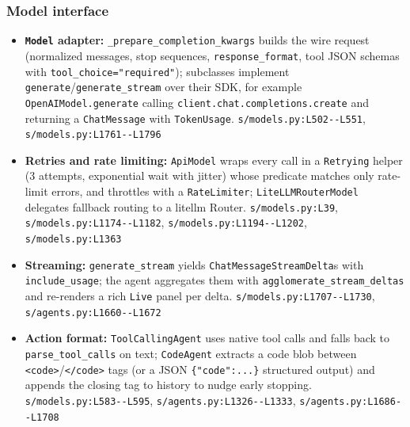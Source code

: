 \subsubsection*{Model interface}
\begin{itemize}
\item \textbf{\texttt{Model} adapter:} \texttt{\_\allowbreak{}prepare\_\allowbreak{}completion\_\allowbreak{}kwargs} builds the wire request (normalized messages, stop sequences, \texttt{response\_\allowbreak{}format}, tool JSON schemas with \texttt{tool\_\allowbreak{}choice="required"}); subclasses implement \texttt{generate}/\texttt{generate\_\allowbreak{}stream} over their SDK, for example \texttt{OpenAIModel.\allowbreak{}generate} calling \texttt{client.\allowbreak{}chat.\allowbreak{}completions.\allowbreak{}create} and returning a \texttt{ChatMessage} with \texttt{TokenUsage}. \texttt{s/\allowbreak{}models.\allowbreak{}py:\allowbreak{}L502-\allowbreak{}-\allowbreak{}L551}, \texttt{s/\allowbreak{}models.\allowbreak{}py:\allowbreak{}L1761-\allowbreak{}-\allowbreak{}L1796}
\item \textbf{Retries and rate limiting:} \texttt{ApiModel} wraps every call in a \texttt{Retrying} helper (3 attempts, exponential wait with jitter) whose predicate matches only rate-limit errors, and throttles with a \texttt{RateLimiter}; \texttt{LiteLLMRouterModel} delegates fallback routing to a litellm Router. \texttt{s/\allowbreak{}models.\allowbreak{}py:\allowbreak{}L39}, \texttt{s/\allowbreak{}models.\allowbreak{}py:\allowbreak{}L1174-\allowbreak{}-\allowbreak{}L1182}, \texttt{s/\allowbreak{}models.\allowbreak{}py:\allowbreak{}L1194-\allowbreak{}-\allowbreak{}L1202}, \texttt{s/\allowbreak{}models.\allowbreak{}py:\allowbreak{}L1363}
\item \textbf{Streaming:} \texttt{generate\_\allowbreak{}stream} yields \texttt{ChatMessageStreamDelta}s with \texttt{include\_\allowbreak{}usage}; the agent aggregates them with \texttt{agglomerate\_\allowbreak{}stream\_\allowbreak{}deltas} and re-renders a rich \texttt{Live} panel per delta. \texttt{s/\allowbreak{}models.\allowbreak{}py:\allowbreak{}L1707-\allowbreak{}-\allowbreak{}L1730}, \texttt{s/\allowbreak{}agents.\allowbreak{}py:\allowbreak{}L1660-\allowbreak{}-\allowbreak{}L1672}
\item \textbf{Action format:} \texttt{ToolCallingAgent} uses native tool calls and falls back to \texttt{parse\_\allowbreak{}tool\_\allowbreak{}calls} on text; \texttt{CodeAgent} extracts a code blob between \texttt{<code>}/\texttt{</\allowbreak{}code>} tags (or a JSON \texttt{\{"code":\allowbreak{}.\allowbreak{}.\allowbreak{}.\allowbreak{}\}} structured output) and appends the closing tag to history to nudge early stopping. \texttt{s/\allowbreak{}models.\allowbreak{}py:\allowbreak{}L583-\allowbreak{}-\allowbreak{}L595}, \texttt{s/\allowbreak{}agents.\allowbreak{}py:\allowbreak{}L1326-\allowbreak{}-\allowbreak{}L1333}, \texttt{s/\allowbreak{}agents.\allowbreak{}py:\allowbreak{}L1686-\allowbreak{}-\allowbreak{}L1708}
\end{itemize}

